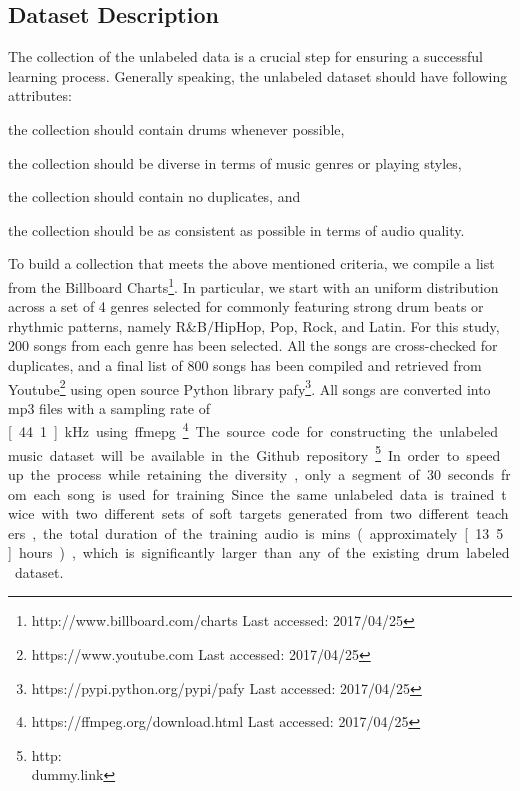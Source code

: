 \documentclass{article}
\begin{document}
\subsection{Dataset Description}
The collection of the unlabeled data is a crucial step for ensuring a successful learning process. Generally speaking, the unlabeled dataset should have following attributes: 
\begin{inparaenum}[(i)]
    \item   the collection should contain drums whenever possible,
    \item   the collection should be diverse in terms of music genres or playing styles,
    \item   the collection should contain no duplicates, and
    \item   the collection should be as consistent as possible in terms of audio quality. 
\end{inparaenum}
To build a collection that meets the above mentioned criteria, we compile a list from the Billboard Charts\footnote{http://www.billboard.com/charts Last accessed: 2017/04/25}. In particular, we start with an uniform distribution across a set of 4 genres selected for commonly featuring strong drum beats or rhythmic patterns, namely R\&B$\slash$HipHop, Pop, Rock, and Latin. For this study, 200 songs from each genre has been selected. All the songs are cross-checked for duplicates, and a final list of 800 songs has been compiled and retrieved from Youtube\footnote{https://www.youtube.com Last accessed: 2017/04/25} using open source Python library pafy\footnote{https://pypi.python.org/pypi/pafy Last accessed: 2017/04/25}. All songs are converted into mp3 files with a sampling rate of \unit[44.1]{kHz} using ffmepg\footnote{https://ffmpeg.org/download.html Last accessed: 2017/04/25}. The source code for constructing the unlabeled music dataset will be available in the Github repository\footnote{http:\\dummy.link}. In order to speed up the process while retaining the diversity, only a segment of 30 seconds from each song is used for training. Since the same unlabeled data is trained twice with two different sets of soft targets generated from two different teachers, the total duration of the training audio is \unit[800]{mins} (approximately \unit[13.5]{hours}), which is significantly larger than any of the existing drum labeled dataset. 
\end{document}
